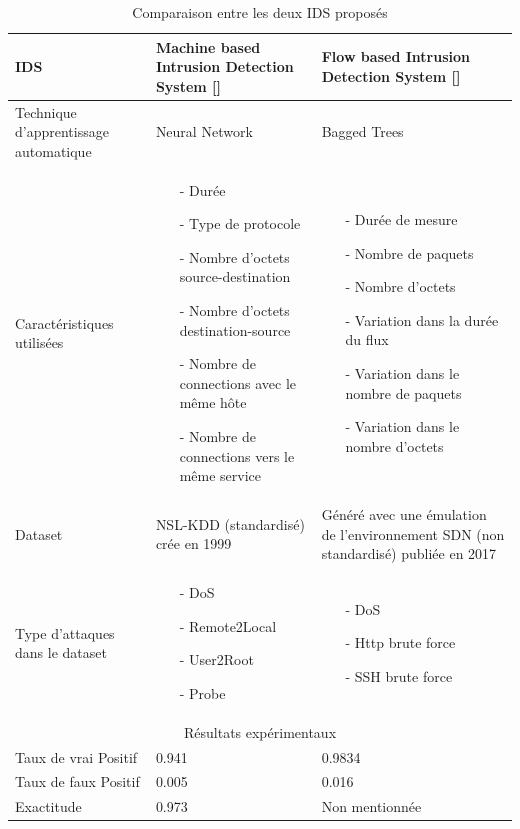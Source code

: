 \begin{table}[h]
\begin{center}
\begin{tabular}{  | m{4cm} | m{5cm} | m{5cm} | }
\hline
IDS & Machine based Intrusion Detection System [\cite{10}] & Flow based Intrusion Detection System [\cite{8}]\\
\hline
Technique d’apprentissage automatique & Neural Network & Bagged Trees\\
\hline
Caractéristiques utilisées & \begin{itemize}
\item[-] Durée
\item[-] Type de protocole
\item[-] Nombre d’octets source-destination
\item[-] Nombre d’octets destination-source
\item[-] Nombre de connections avec le même hôte
\item[-] Nombre de connections vers le même service
\end{itemize} &\begin{itemize}
\item[-] Durée de mesure
\item[-] Nombre de paquets
\item[-] Nombre d’octets
\item[-] Variation dans la durée du flux
\item[-] Variation dans le nombre de paquets
\item[-] Variation dans le nombre d’octets
\end{itemize} \\
\hline
Dataset & NSL-KDD (standardisé) crée en 1999 & Généré avec une émulation de l’environnement SDN (non standardisé) publiée en 2017 \\
\hline 
Type d’attaques dans le dataset  & \begin{itemize}
\item[-] DoS
\item[-] Remote2Local
\item[-] User2Root
\item[-] Probe
\end{itemize} &\begin{itemize}
\item[-] DoS
\item[-] Http brute force
\item[-] SSH brute force
\end{itemize}\\
\hline
\multicolumn{3}{c}{Résultats expérimentaux}\\
\hline
Taux de vrai Positif & 0.941 & 0.9834\\
\hline
Taux de faux Positif & 0.005 & 0.016\\
\hline
Exactitude & 0.973 & Non mentionnée \\
\hline
\end{tabular}
\caption{Comparaison entre les deux IDS proposés}
\end{center}
\label{table:IDS}
\end{table}

